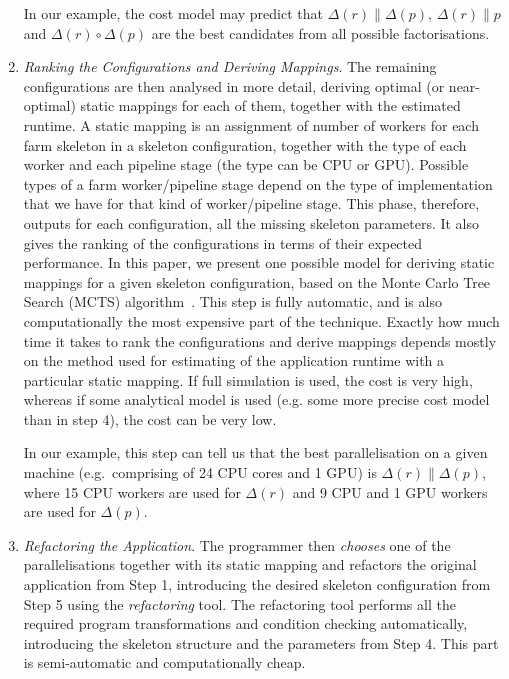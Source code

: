 \documentclass[smallextended]{svjour3}
\begin{document}
\begin{enumerate}
In our example, the cost model may predict that $\Delta(r) \parallel
\Delta(p)$, $\Delta(r) \parallel p$ and $\Delta(r) \circ \Delta(p)$
are the best candidates from all possible factorisations.

\item \emph{Ranking the Configurations and Deriving Mappings}. The remaining configurations are then analysed in more detail,
  deriving optimal (or near-optimal) static mappings for each of them,
  together with the estimated runtime. A static mapping is an
  assignment of number of workers for each farm skeleton in a skeleton
  configuration, together with the type of each worker and each
  pipeline stage (the type can be CPU
  or GPU). Possible types of a farm worker/pipeline stage depend on
  the type of implementation that we have for that kind of
  worker/pipeline stage. This phase, therefore, outputs
  for each configuration, all the missing skeleton parameters. It also 
  gives the ranking of the configurations
  in terms of their expected performance. In this paper, we present
  one possible model for deriving static mappings for a given skeleton
  configuration, based on the Monte Carlo Tree Search (MCTS)
  algorithm~\cite{mc}. This step is fully automatic, and is also
  computationally the most expensive part of the technique. Exactly
  how much time it takes to rank the configurations and derive
  mappings depends mostly on the method used for estimating of the
  application runtime with a particular static mapping. If full simulation is used,
  the cost is very high, whereas if some analytical model is used
  (e.g. some more precise cost model than in step 4), the cost can be
  very low.


%
  In our example, this step can tell us that the best parallelisation on a given
  machine (e.g.\ comprising of 24 CPU cores and 1 GPU) is
  $\Delta(r) \parallel \Delta(p)$, where 15 CPU workers are used for
  $\Delta(r)$ and 9 CPU and 1 GPU workers are used for
  $\Delta(p)$. 
\item \emph{Refactoring the Application}. The programmer then \emph{chooses} one of the parallelisations together with its static mapping
and refactors the original application from Step 1, introducing the
desired skeleton configuration from Step 5 using the \emph{refactoring} tool.
The refactoring tool performs all the required program transformations and condition checking automatically,
introducing the skeleton structure and the parameters from Step
4. This part is semi-automatic and computationally cheap.


\end{enumerate}
\end{document}
